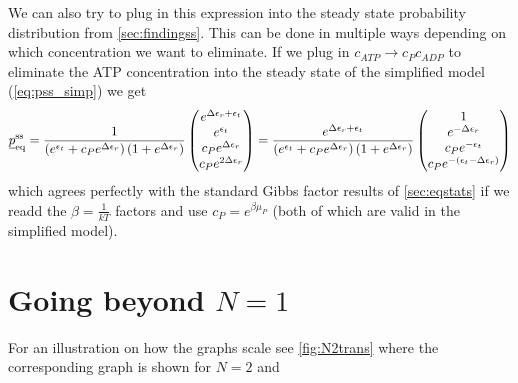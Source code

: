 \documentclass[11pt]{article}
\newcommand{\suf}[2]{\stackunder[0.5pt]{\stackunder[1pt]{\ensuremath{#1}}{\rule{\widthof{\ensuremath{#2}}*\real{0.9}}{.1ex}}}{}}
\newcommand{\su}[1]{\suf{#1}{#1}}
\begin{document}
We can also try to plug in this expression into the steady state probability distribution from \cref{sec:findingss}.
This can be done in multiple ways depending on which concentration we want to eliminate.
If we plug in $c_{ATP} \rightarrow c_Pc_{ADP}$ to eliminate the ATP concentration into the steady state of the simplified model (\cref{eq:pss_simp}) we get
\begin{equation}
    \su{p}^\text{ss}_\text{eq} = \frac{1}{\left( e^{\epsilon_{t}} + c_P e^{\Delta\epsilon_{r}} \right) \left( 1 + e^{\Delta\epsilon_{r}} \right)}\begin{pmatrix}
        e^{\Delta\epsilon_{r} + \epsilon_{t}} \\
        e^{\epsilon_{t}} \\
        c_P e^{\Delta\epsilon_{r}} \\
        c_P e^{2 \Delta\epsilon_{r}} \\
    \end{pmatrix} = \frac{e^{\Delta\epsilon_{r} + \epsilon_{t}}}{\left( e^{\epsilon_{t}} + c_P e^{\Delta\epsilon_{r}} \right) \left( 1 + e^{\Delta\epsilon_{r}} \right)}\begin{pmatrix}
        1 \\
        e^{-\Delta\epsilon_r} \\
        c_P e^{-\epsilon_t} \\
        c_P e^{-(\epsilon_t-\Delta\epsilon_r)} \\
    \end{pmatrix}
\end{equation}
which agrees perfectly with the standard Gibbs factor results of \cref{sec:eqstats} if we readd the $\beta=\frac{1}{\si{k}T}$ factors and use $c_P=e^{\beta \mu_P}$ (both of which are valid in the simplified model).

\newpage
\section{Going beyond $N=1$}
For an illustration on how the graphs scale see \cref{fig:N2trans} where the corresponding graph is shown for $N=2$ and 
\end{document}
